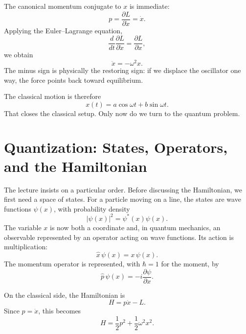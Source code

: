 The canonical momentum conjugate to \(x\) is immediate:
\begin{equation}
p=\frac{\partial L}{\partial \dot x}=\dot x.
\end{equation}
Applying the Euler--Lagrange equation,
\begin{equation}
\frac{d}{dt}\frac{\partial L}{\partial \dot x}
=
\frac{\partial L}{\partial x},
\end{equation}
we obtain
\begin{equation}
\ddot x=-\omega^{2}x.
\end{equation}
The minus sign is physically the restoring sign: if we displace the oscillator one way, the force points back toward equilibrium.

The classical motion is therefore
\begin{equation}
x(t)=a\cos\omega t+b\sin\omega t.
\end{equation}
That closes the classical setup. Only now do we turn to the quantum problem.

\section{Quantization: States, Operators, and the Hamiltonian}

The lecture insists on a particular order. Before discussing the Hamiltonian, we first need a space of states. For a particle moving on a line, the states are wave functions \(\psi(x)\), with probability density
\begin{equation}
|\psi(x)|^{2}=\psi^{*}(x)\psi(x).
\end{equation}
The variable \(x\) is now both a coordinate and, in quantum mechanics, an observable represented by an operator acting on wave functions. Its action is multiplication:
\begin{equation}
\hat x\,\psi(x)=x\,\psi(x).
\end{equation}
The momentum operator is represented, with \(\hbar=1\) for the moment, by
\begin{equation}
\hat p\,\psi(x)=-i\frac{\partial \psi}{\partial x}.
\end{equation}

On the classical side, the Hamiltonian is
\begin{equation}
H=p\dot x-L.
\end{equation}
Since \(p=\dot x\), this becomes
\begin{equation}
H=\frac{1}{2}p^{2}+\frac{1}{2}\omega^{2}x^{2}.
\end{equation}

